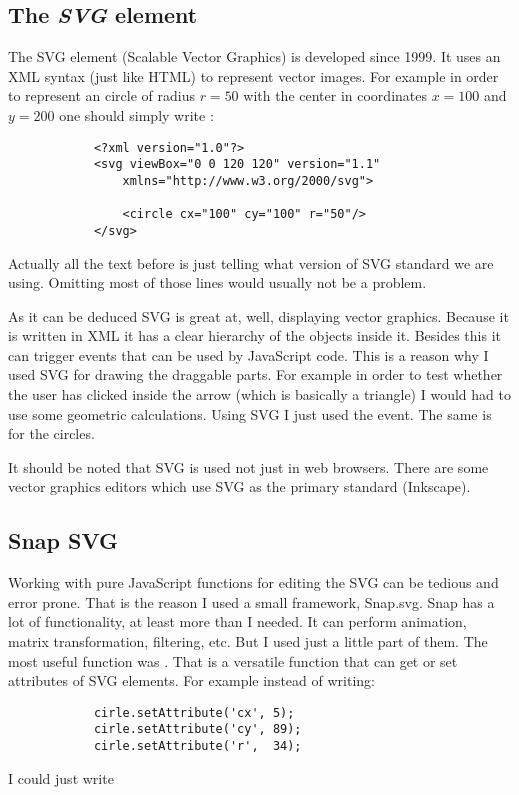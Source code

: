         \subsection{The \emph{SVG} element}
            The SVG element (Scalable Vector Graphics) is developed since 1999. It uses an XML syntax (just like HTML) to represent vector images. For example in order to represent an circle of radius $r=50$ with the center in coordinates $x=100$ and $y=200$ one should simply write :
            \begin{lstlisting}
            <?xml version="1.0"?>
            <svg viewBox="0 0 120 120" version="1.1"
                xmlns="http://www.w3.org/2000/svg">
                
                <circle cx="100" cy="100" r="50"/>
            </svg>
            \end{lstlisting}
            
            Actually all the text before  is just telling what version of SVG standard we are using. Omitting most of those lines would usually not be a problem.

            As it can be deduced SVG is great at, well, displaying vector graphics. Because it is written in XML it has a clear hierarchy of the objects inside it. Besides this it can trigger events that can be used by JavaScript code. This is a reason why I used SVG for drawing the draggable parts. For example in order to test whether the user has clicked inside the arrow (which is basically a triangle) I would had to use some geometric calculations. Using SVG I just used the  event. The same is for the circles.

            It should be noted that SVG is used not just in web browsers. There are some vector graphics editors which use SVG as the primary standard (Inkscape).

        \subsection{Snap SVG} 
            Working with pure JavaScript functions for editing the SVG can be tedious and error prone. That is the reason I used a small framework, Snap.svg. 
            Snap has a lot of functionality, at least more than I needed. 
            It can perform animation, matrix transformation, filtering, etc. But I used just a little part of them. 
            The most useful function was . 
            That is a versatile function that can get or set attributes of SVG elements. For example instead of writing:
            \begin{lstlisting}
            cirle.setAttribute('cx', 5);
            cirle.setAttribute('cy', 89);
            cirle.setAttribute('r',  34);
            \end{lstlisting}
                        I could just write

